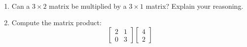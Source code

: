 \documentclass[10pt]{article}
\begin{document}
\namedateperiod

\vspace{0.15in}

\begin{enumerate}[leftmargin=1.6em, itemsep=20pt]

\item Can a $3 \times 2$ matrix be multiplied by a $3 \times 1$ matrix? Explain your reasoning.

\vspace{1.8in}

\item Compute the matrix product:
\[
  \begin{bmatrix}2 & 1 \\ 0 & 3\end{bmatrix}
  \begin{bmatrix}4 \\ 2\end{bmatrix}
\]

\vspace{1.8in}

\end{enumerate}
\end{document}
